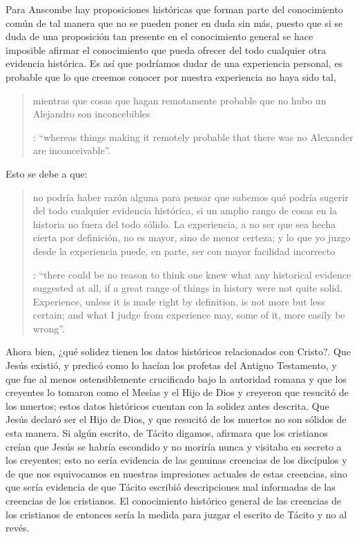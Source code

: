 Para Anscombe hay proposiciones históricas que forman parte del conocimiento común de tal manera que no se pueden poner en duda sin más, puesto que si se duda de una proposición tan presente en el conocimiento general se hace imposible afirmar el conocimiento que pueda ofrecer del todo cualquier otra evidencia histórica. Es así que podríamos dudar de una experiencia personal, es probable que lo que creemos conocer por nuestra experiencia no haya sido tal, \blockquote[{\Cite[27]{anscombe2008faith:prophandmi}}: \enquote{whereas things making it remotely probable that there was no Alexander are inconceivable}.]{mientras que cosas que hagan remotamente probable que no hubo un Alejandro son inconcebibles}. Esto se debe a que: \blockquote[{\Cite[27]{anscombe2008faith:prophandmi}}: \enquote{there could be no reason to think one knew what any historical evidence suggested at all, if a great range of things in history were not quite solid. Experience, unless it is made right by definition, is not more but less certain; and what I judge from experience may, some of it, more easily be wrong}.]{no podría haber razón alguna para pensar que sabemos qué podría sugerir del todo cualquier evidencia histórica, si un amplio rango de cosas en la historia no fuera del todo sólido. La experiencia, a no ser que sea hecha cierta por definición, no es mayor, sino de menor certeza; y lo que yo juzgo desde la experiencia puede, en parte, ser con mayor facilidad incorrecto}.

Ahora bien, ¿qué solidez tienen los datos históricos relacionados con Cristo?. Que Jesús existió, y predicó como lo hacían los profetas del Antiguo Testamento, y que fue al menos ostensiblemente crucificado bajo la autoridad romana y que los creyentes lo tomaron como el Mesías y el Hijo de Dios y creyeron que resucitó de los muertos; estos datos históricos cuentan con la solidez antes descrita. Que Jesús declaró ser el Hijo de Dios, y que resucitó de los muertos no son sólidos de esta manera. Si algún escrito, de Tácito digamos, afirmara que los cristianos creían que Jesús se habría escondido y no moriría nunca y visitaba en secreto a los creyentes; esto no sería evidencia de las genuinas creencias de los discípulos y de que nos equivocamos en nuestras impresiones actuales de estas creencias, sino que sería evidencia de que Tácito escribió descripciones mal informadas de las creencias de los cristianos. El conocimiento histórico general de las creencias de los cristianos de entonces sería la medida para juzgar el escrito de Tácito y no al revés.

